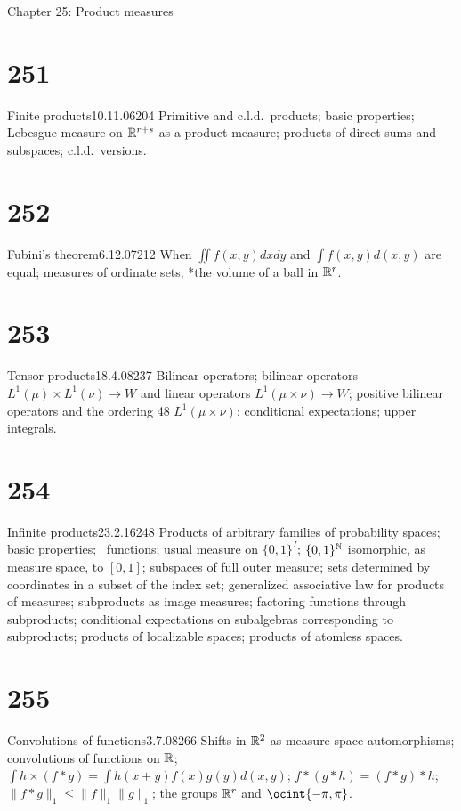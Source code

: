 
 Chapter 25:  Product measures


\section{251}{Finite products}{10.11.06}{204}{}
{Primitive and c.l.d.\ products;  basic properties;  Lebesgue
measure on $\Bbb{R}^{r+s}$ as a product measure;  products of direct sums
and subspaces;  c.l.d.\ versions.}

\section{252}{Fubini's theorem}{6.12.07}{212}{}
{When ${\iint}f(x,y)dxdy$ and ${\int}f(x,y)d(x,y)$ are equal;  measures
of ordinate sets;  *the volume of a ball in $\Bbb{R}^r$.}

\section{253}{Tensor products}{18.4.08}{237}{}
{Bilinear operators;  bilinear operators $L^1(\mu){\times}L^1(\nu){\to}W$
and linear operators $L^1(\mu\times\nu){\to}W$;  positive bilinear
operators and the ordering 48 $L^1(\mu\times\nu)$;
conditional expectations;  upper integrals.}

\section{254}{Infinite products}{23.2.16}{248}{}
{Products of arbitrary families of probability spaces;  basic
properties;  \imp\ functions;  usual measure on $\{0,1\}^I$;
$\{0,1\}^{\Bbb{N}}$ isomorphic, as measure space, to $[0,1]$;  subspaces
of full outer measure;  sets determined by coordinates in
a subset of the index set;  generalized associative law for products of
measures;  subproducts as image measures;  factoring functions through
subproducts;  conditional expectations on subalgebras corresponding to
subproducts;  products of localizable spaces;  products of atomless spaces.}

\section{255}{Convolutions of functions}{3.7.08}{266}{}
{Shifts in $\Bbb{R}^2$ as measure space automorphisms;
convolutions of functions on $\Bbb{R}$;
${\int}h\times(f*g)={\int}h(x+y)f(x)g(y)d(x,y)$;  $f*(g*h)=(f*g)*h$;
$\|f*g\|_1\le
\|f\|_1\|g\|_1$;  %
the groups $\Bbb{R}^r$ and $\ocint{-\pi,\pi}$.}

